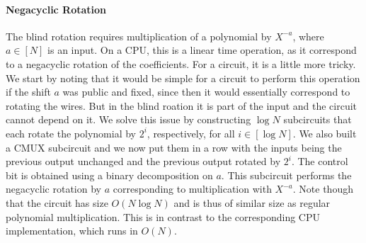 \documentclass[final]{zamarep}
\begin{document}
\paragraph{Negacyclic Rotation}
The blind rotation requires multiplication of a polynomial by $X^{-a}$, where $a \in [N]$ is an input. On a CPU, this is a linear time operation, as it correspond to a negacyclic rotation of the coefficients. For a circuit, it is a little more tricky. We start by noting that it would be simple for a circuit to perform this operation if the shift $a$ was public and fixed, since then it would essentially correspond to rotating the wires. But in the blind roation it is part of the input and the circuit cannot depend on it. We solve this issue by constructing $\log N$ subcircuits that each rotate the polynomial by $2^i$, respectively, for all $i \in [\log N]$. We also built a CMUX subcircuit and we now put them in a row with the inputs being the previous output unchanged and the previous output rotated by $2^i$. The control bit is obtained using a binary decomposition on $a$. This subcircuit performs the negacyclic rotation by $a$ corresponding to multiplication with $X^{-a}$. Note though that the circuit has size $O(N \log N)$ and is thus of similar size as regular polynomial multiplication. This is in contrast to the corresponding CPU implementation, which runs in $O(N)$.
\end{document}
